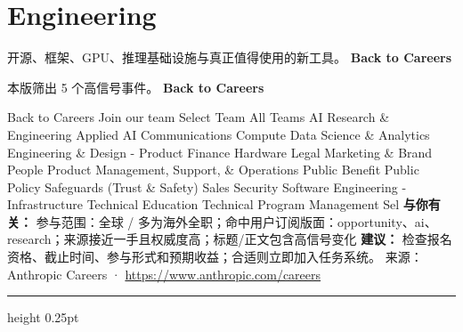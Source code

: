 \documentclass[10.5pt]{ctexart}
\begin{document}
\section*{Engineering}
{\color{ormuted} 开源、框架、GPU、推理基础设施与真正值得使用的新工具。}
\vspace{2mm}
{\LARGE\bfseries Back to Careers}\par
\vspace{1mm}
{\color{ormuted} 本版筛出 5 个高信号事件。}
\vspace{3mm}
{\Large\bfseries Back to Careers}\par
Back to Careers Join our team Select Team All Teams AI Research \& Engineering Applied AI Communications Compute Data Science \& Analytics Engineering \& Design - Product Finance Hardware Legal Marketing \& Brand People Product Management, Support, \& Operations Public Benefit Public Policy Safeguards (Trust \& Safety) Sales Security Software Engineering - Infrastructure Technical Education Technical Program Management Sel
\textbf{与你有关：} 参与范围：全球 / 多为海外全职；命中用户订阅版面：opportunity、ai、research；来源接近一手且权威度高；标题/正文包含高信号变化
\textbf{建议：} 检查报名资格、截止时间、参与形式和预期收益；合适则立即加入任务系统。
{\footnotesize\color{ormuted} 来源：Anthropic Careers · \url{https://www.anthropic.com/careers}}
\vspace{4mm}
\hrule height 0.25pt
\vspace{3mm}
\end{document}
